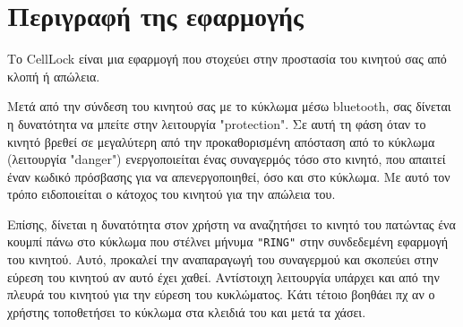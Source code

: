 \section{Περιγραφή της εφαρμογής}
Το CellLock είναι μια εφαρμογή που στοχεύει στην προστασία του κινητού σας από κλοπή ή απώλεια.

Μετά από την σύνδεση του κινητού σας με το κύκλωμα μέσω bluetooth, σας δίνεται η δυνατότητα να μπείτε στην λειτουργία "protection".
Σε αυτή τη φάση όταν το κινητό βρεθεί σε μεγαλύτερη από την προκαθορισμένη απόσταση από το κύκλωμα (λειτουργία "danger") ενεργοποιείται ένας συναγερμός τόσο στο κινητό, που απαιτεί έναν κωδικό πρόσβασης για να απενεργοποιηθεί, όσο και στο κύκλωμα.
Με αυτό τον τρόπο ειδοποιείται ο κάτοχος του κινητού για την απώλεια του.

Επίσης, δίνεται η δυνατότητα στον χρήστη να αναζητήσει το κινητό του πατώντας ένα κουμπί πάνω στο κύκλωμα που στέλνει μήνυμα \texttt{"RING"} στην συνδεδεμένη εφαρμογή του κινητού. Αυτό, προκαλεί την αναπαραγωγή του συναγερμού και σκοπεύει στην εύρεση του κινητού αν αυτό έχει χαθεί. Αντίστοιχη λειτουργία υπάρχει και από την πλευρά του κινητού για την εύρεση του κυκλώματος. Κάτι τέτοιο βοηθάει πχ αν ο χρήστης τοποθετήσει το κύκλωμα στα κλειδιά του και μετά τα χάσει.
